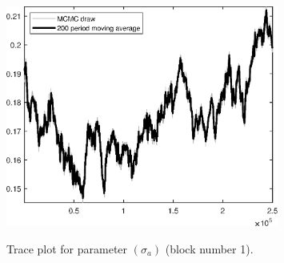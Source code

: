 \begin{figure}[H]
\centering
  \includegraphics[width=0.8\textwidth]{BRS_extended_fd/graphs/TracePlot_sigma_a_blck_1}\\
    \caption{Trace plot for parameter $(\sigma_a)$ (block number 1).}
\end{figure}

